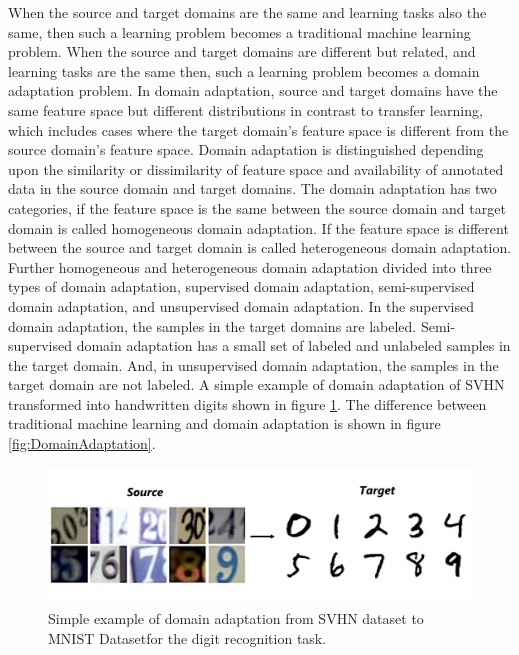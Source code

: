 When the source and target domains are the same and learning tasks also the same, then such a learning problem becomes a traditional machine learning problem\cite{5288526}. When the source and target domains are different but related, and learning tasks are the same then, such a learning problem becomes a domain adaptation problem\cite{5288526}. In domain adaptation, source and target domains have the same feature space but different distributions in contrast to transfer learning, which includes cases where the target domain's feature space is different from the source domain's feature space\cite{5288526}. Domain adaptation is distinguished depending upon the similarity or dissimilarity of feature space and availability of annotated data in the source domain and target domains. The domain adaptation has two categories, if the feature space is the same between the source domain and target domain is called homogeneous domain adaptation. If the feature space is different between the source and target domain is called heterogeneous domain adaptation. Further homogeneous and heterogeneous domain adaptation divided into three types of domain adaptation, supervised domain adaptation, semi-supervised domain adaptation, and unsupervised domain adaptation. In the supervised domain adaptation, the samples in the target domains are labeled. Semi-supervised domain adaptation has a small set of labeled and unlabeled samples in the target domain. And, in unsupervised domain adaptation, the samples in the target domain are not labeled\cite{5288526}. A simple example of domain adaptation of  \ac{SVHN} transformed into handwritten digits shown in figure \ref{fig:DA}. The difference between traditional machine learning and domain adaptation is shown in figure \ref{fig:DomainAdaptation}.


\begin{figure}[H]
        \begin{center}
 	    \includegraphics[scale=0.15]{images/Introduction/DA.png}
	    \caption[Simple example of domain adaptation from \ac{SVHN} dataset to \ac{MNIST} Dataset for the digit recognition task.]{Simple example of domain adaptation from \ac{SVHN} dataset\cite{37648} to \ac{MNIST} Dataset\footnotemark for the digit recognition task.\footnotemark}
	    \label{fig:DA}
	    \end{center}
\end{figure}





